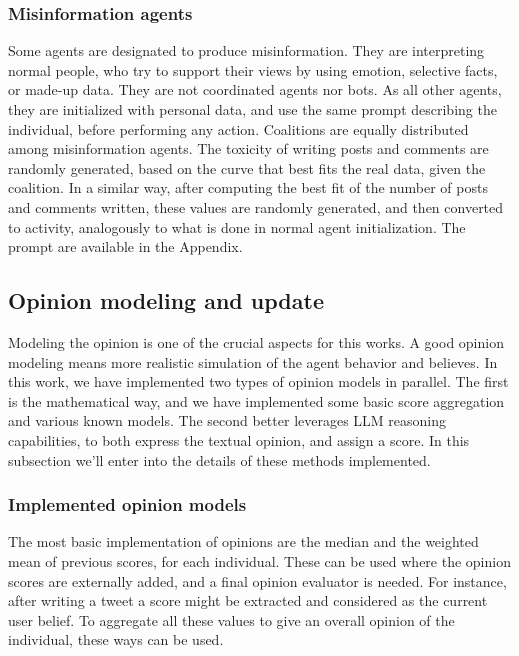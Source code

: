 

\subsubsection{Misinformation agents}
Some agents are designated to produce misinformation. They are interpreting normal people, who try to support their views by using emotion, selective facts, or made-up data. They are not coordinated agents nor bots.
As all other agents, they are initialized with personal data, and use the same prompt describing the individual, before performing any action.
Coalitions are equally distributed among misinformation agents.
The toxicity of writing posts and comments are randomly generated, based on the curve that best fits the real data, given the coalition.
In a similar way, after computing the best fit of the number of posts and comments written, these values are randomly generated, and then converted to activity, analogously to what is done in normal agent initialization.
The prompt are available in the Appendix.

\subsection{Opinion modeling and update}
Modeling the opinion is one of the crucial aspects for this works. A good opinion modeling means more realistic simulation of the agent behavior and believes.
In this work, we have implemented two types of opinion models in parallel. The first is the mathematical way, and we have implemented some basic score aggregation and various known models. The second better leverages LLM reasoning capabilities, to both express the textual opinion, and assign a score. 
In this subsection we'll enter into the details of these methods implemented.

\subsubsection{Implemented opinion models}
The most basic implementation of opinions are the median and the weighted mean of previous scores, for each individual. These can be used where the opinion scores are externally added, and a final opinion evaluator is needed. For instance, after writing a tweet a score might be extracted and considered as the current user belief. To aggregate all these values to give an overall opinion of the individual, these ways can be used.

